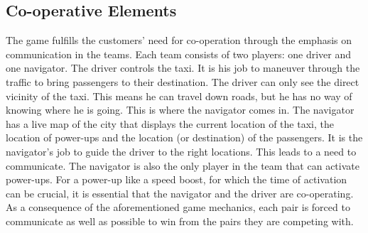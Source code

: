 \subsection{Co-operative Elements}
The game fulfills the customers' need for co-operation through the emphasis on communication in the teams. Each team consists of two players: one driver and one navigator. The driver controls the taxi. It is his job to maneuver through the traffic to bring passengers to their destination. The driver can only see the direct vicinity of the taxi. This means he can travel down roads, but he has no way of knowing where he is going. This is where the navigator comes in. The navigator has a live map of the city that displays the current location of the taxi, the location of power-ups and the location (or destination) of the passengers. It is the navigator's job to guide the driver to the right locations. This leads to a need to communicate. The navigator is also the only player in the team that can activate power-ups. For a power-up like a speed boost, for which the time of activation can be crucial, it is essential that the navigator and the driver are co-operating. As a consequence of the aforementioned game mechanics, each pair is forced to communicate as well as possible to win from the pairs they are competing with.


